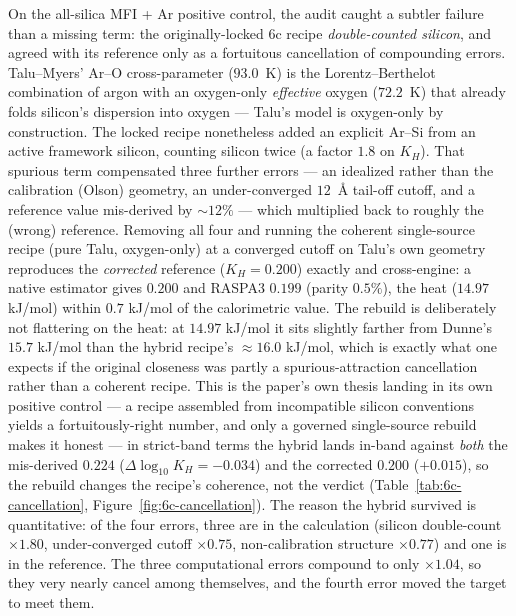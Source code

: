 On the all-silica MFI + Ar positive control, the audit caught a subtler failure than a missing term: the
originally-locked 6c recipe \emph{double-counted silicon}, and agreed with its reference only as a fortuitous
cancellation of compounding errors. Talu--Myers' Ar--O cross-parameter (\(93.0\)~K) is the
Lorentz--Berthelot combination of argon with an oxygen-only \emph{effective} oxygen (\(72.2\)~K) that
already folds silicon's dispersion into oxygen --- Talu's model is oxygen-only by construction. The locked
recipe nonetheless added an explicit Ar--Si from an active framework silicon, counting silicon twice (a
factor \(1.8\) on \(K_H\)). That spurious term compensated three further errors --- an idealized rather
than the calibration (Olson) geometry, an under-converged \(12\)~\AA{} tail-off cutoff, and a reference
value mis-derived by \(\sim\!12\%\) --- which multiplied back to roughly the (wrong) reference. Removing
all four and running the coherent single-source recipe (pure Talu, oxygen-only) at a converged cutoff on
Talu's own geometry reproduces the \emph{corrected} reference (\(K_H = 0.200\)) exactly and cross-engine:
a native estimator gives \(0.200\) and RASPA3 \(0.199\) (parity \(0.5\%\)), the heat (\(14.97\) kJ/mol)
within \(0.7\) kJ/mol of the calorimetric value. The rebuild is deliberately not flattering on the heat:
at \(14.97\) kJ/mol it sits slightly farther from Dunne's \(15.7\) kJ/mol than the hybrid recipe's
\(\approx\!16.0\) kJ/mol, which is exactly what one expects if the original closeness was partly a
spurious-attraction cancellation rather than a coherent recipe. This is the paper's own thesis landing in its own
positive control --- a recipe assembled from incompatible silicon conventions yields a fortuitously-right
number, and only a governed single-source rebuild makes it honest --- in strict-band terms the hybrid lands in-band
against \emph{both} the mis-derived \(0.224\) (\(\Delta\log_{10}K_H = -0.034\)) and the corrected \(0.200\)
(\(+0.015\)), so the rebuild changes the
recipe's coherence, not the verdict (Table~\ref{tab:6c-cancellation}, Figure~\ref{fig:6c-cancellation}).
The reason the hybrid survived is quantitative: of the four errors, three are in the calculation
(silicon double-count \(\times1.80\), under-converged cutoff \(\times0.75\), non-calibration structure
\(\times0.77\)) and one is in the reference. The three computational errors compound to only
\(\times1.04\), so they very nearly cancel among themselves, and the fourth error moved the target to
meet them.

